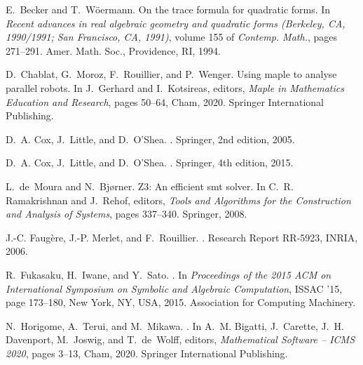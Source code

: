 \documentclass{birkjour}
\theoremstyle{plain}
\theoremstyle{definition}
\begin{document}
    \def\cprime{$'$}
    \begin{thebibliography}{10}

        E.~Becker and T.~W\"{o}ermann.
        \newblock On the trace formula for quadratic forms.
        \newblock In {\em Recent advances in real algebraic geometry and quadratic
        forms ({B}erkeley, {CA}, 1990/1991; {S}an {F}rancisco, {CA}, 1991)}, volume
        155 of {\em Contemp. Math.}, pages 271--291. Amer. Math. Soc., Providence,
        RI, 1994.

        D.~Chablat, G.~Moroz, F.~Rouillier, and P.~Wenger.
        \newblock Using maple to analyse parallel robots.
        \newblock In J.~Gerhard and I.~Kotsireas, editors, {\em Maple in Mathematics
        Education and Research}, pages 50--64, Cham, 2020. Springer International
        Publishing.

        D.~A. Cox, J.~Little, and D.~O’Shea.
        .
        \newblock Springer, 2nd edition, 2005.

        D.~A. Cox, J.~Little, and D.~O’Shea.
        .
        \newblock Springer, 4th edition, 2015.

        L.~de~Moura and N.~Bj{\o}rner.
        \newblock Z3: An efficient smt solver.
        \newblock In C.~R. Ramakrishnan and J.~Rehof, editors, {\em Tools and
        Algorithms for the Construction and Analysis of Systems}, pages 337--340.
        Springer, 2008.

        J.-C. Faug{\`e}re, J.-P. Merlet, and F.~Rouillier.
        .
        \newblock Research Report RR-5923, {INRIA}, 2006.

        R.~Fukasaku, H.~Iwane, and Y.~Sato.
        .
        \newblock In {\em Proceedings of the 2015 ACM on International Symposium on
        Symbolic and Algebraic Computation}, ISSAC '15, page 173–180, New York, NY,
        USA, 2015. Association for Computing Machinery.

        N.~Horigome, A.~Terui, and M.~Mikawa.
        .
        \newblock In A.~M. Bigatti, J.~Carette, J.~H. Davenport, M.~Joswig, and
        T.~de~Wolff, editors, {\em Mathematical Software -- ICMS 2020}, pages 3--13,
        Cham, 2020. Springer International Publishing.


\end{thebibliography}
\end{document}
